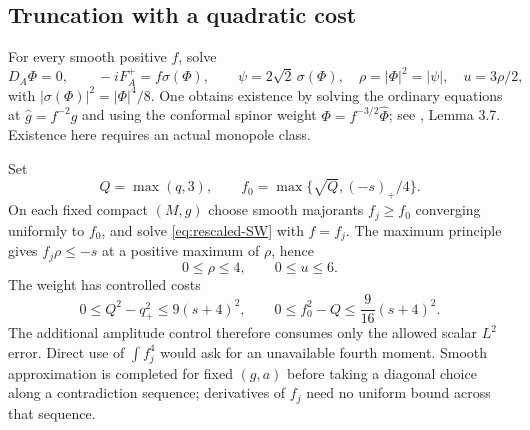 \documentclass[11pt,a4paper]{article}
\theoremstyle{definition}
\theoremstyle{remark}
\numberwithin{equation}{section}
\begin{document}
\subsection{Truncation with a quadratic cost}\label{sub:clipping}
For every smooth positive $f$, solve
\begin{equation}\label{eq:rescaled-SW}
 D_A\Phi=0,\qquad -iF_A^+=f\sigma(\Phi),\qquad
 \psi=2\sqrt2\,\sigma(\Phi),\quad
 \rho=|\Phi|^2=|\psi|,\quad u=3\rho/2,
\end{equation}
with $|\sigma(\Phi)|^2=|\Phi|^4/8$. One obtains existence by solving the
ordinary equations at $\widehat g=f^{-2}g$ and using the conformal spinor
weight $\Phi=f^{-3/2}\widehat\Phi$; see \cite{LeBrunConvex}, Lemma 3.7.
Existence here requires an actual monopole class.

Set
\begin{equation}\label{eq:weight}
 Q=\max(q,3),\qquad f_0=\max\{\sqrt Q,(-s)_+/4\}.
\end{equation}
On each fixed compact $(M,g)$ choose smooth majorants $f_j\ge f_0$
converging uniformly to $f_0$, and solve \eqref{eq:rescaled-SW} with
$f=f_j$. The maximum principle gives $f_j\rho\le-s$ at a positive
maximum of $\rho$, hence
\begin{equation}\label{eq:amplitude-bound}
                         0\le\rho\le4,\qquad0\le u\le6.
\end{equation}
The weight has controlled costs
\begin{equation}\label{eq:clipping-cost}
 0\le Q^2-q_+^2\le9(s+4)^2,
 \qquad0\le f_0^2-Q\le\frac9{16}(s+4)^2.
\end{equation}
The additional amplitude control therefore consumes only the allowed
scalar $L^2$ error. Direct use of $\int f_j^4$ would ask for an
unavailable fourth moment. Smooth approximation is completed for fixed
$(g,a)$ before taking a diagonal choice along a contradiction sequence;
derivatives of $f_j$ need no uniform bound across that sequence.
\end{document}
